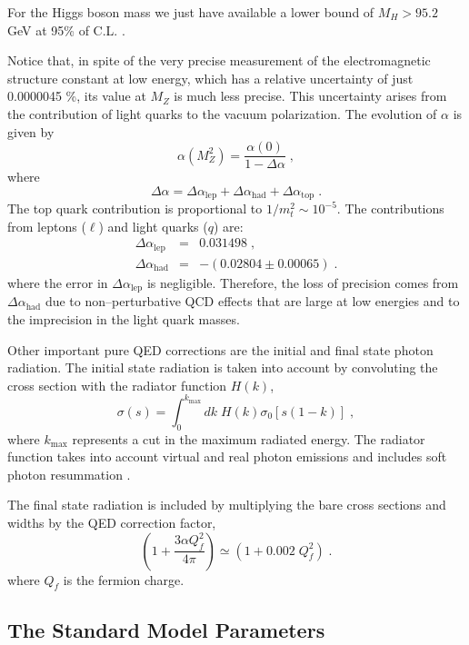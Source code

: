 \documentclass[12pt]{report}
\def\text#1{{\scriptstyle\mathrm{#1}}}
\begin{document}
\vskip 0.5cm
\noindent
For the Higgs boson mass we just have available a lower bound of $M_H
> 95.2$ GeV at 95\% of C.L. \cite{Higgs:99}.

Notice that, in spite of the very precise measurement of the
electromagnetic structure constant at low energy, which has a
relative uncertainty of just 0.0000045 \%, its value at $M_Z$ is much
less precise. This uncertainty arises from  the  contribution of
light quarks to the vacuum polarization. The evolution of 
$\alpha$ is given by
\begin{equation}
\alpha(M_Z^2) = \frac{\alpha (0)}{1 - \Delta\alpha} \; ,
\label{alp:mz}
\end{equation}
where
\[
\Delta\alpha = \Delta\alpha_{\text{lep}} + \Delta\alpha_{\text{had}} +
\Delta\alpha_{\text{top}} \; .
\]
The top quark contribution is proportional to $1/m_t^2 \sim 10^{-5}$.
The contributions from leptons ($\ell$) \cite{Steinhauser:98}  and
light quarks ($q$) \cite{Eidelmann:95} are:
\begin{eqnarray}
\Delta\alpha_{\text{lep}} &=&  0.031498 
\; ,
\nonumber \\
\Delta\alpha_{\text{had}} &=& - (0.02804 \pm
0.00065) \; .
\label{del:alp}
\end{eqnarray}
where the error in $\Delta\alpha_{\text{lep}}$ is negligible.
Therefore, the loss of precision comes from
$\Delta\alpha_{\text{had}}$ due to non--perturba\-ti\-ve QCD effects
that are large at low energies and to the imprecision in the light
quark masses.

Other important pure QED corrections are the initial and
final state photon radiation. The initial state radiation is taken
into account by convoluting the cross section with the radiator
function $H(k)$,
\[
\sigma(s) = \int_0^{k_{\text{max}}} dk \; H(k) \sigma_0[s(1-k)] \; ,
\]
where $k_{\text{max}}$ represents a cut in the maximum radiated
energy. The radiator function takes into account virtual and real photon
emissions and includes soft photon resummation \cite{Montagna:97}.

The final state radiation is included by multiplying the bare cross
sections and widths by the QED correction factor, 
\[
\left(1 + \frac{3\alpha Q_f^2}{4\pi}\right)
\simeq ( 1 + 0.002 \; Q_f^2 ) \; .
\]
where $Q_f$ is the fermion charge.


\subsection{The Standard Model Parameters} \indent
\end{document}
